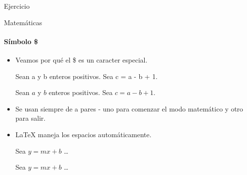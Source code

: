 \begin{frame}[fragile]{Ejercicio}

    
\end{frame}

\begin{frame}[fragile]{Matemáticas}
    \framesubtitle{Símbolo \$}
    \begin{itemize}
        \item Veamos por qué el \$ es un caracter especial.
        \small
        \begin{exampletwouptiny}
Sean a y b enteros positivos. 
Sea c = a - b + 1.

Sean $a$ y $b$ enteros positivos. 
Sea $c = a - b + 1$.
        \end{exampletwouptiny}
        \item Se usan siempre de a pares - uno para comenzar el modo matemático y otro para salir.
        \item \LaTeX{} maneja los espacios automáticamente.
            \begin{exampletwouptiny}
Sea $y=mx+b$ \ldots

Sea $y = m x + b$ \ldots
        \end{exampletwouptiny}
    \end{itemize}
\end{frame}


